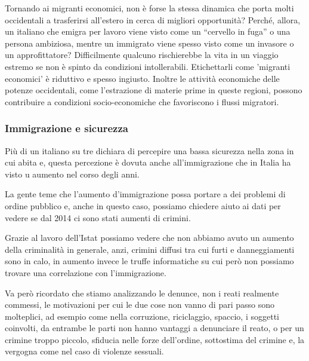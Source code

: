 \documentclass[12pt]{book} %
\begin{document}
Tornando ai migranti economici, non è forse la stessa dinamica che porta molti occidentali a trasferirsi all’estero in cerca di migliori opportunità? Perché, allora, un italiano che emigra per lavoro viene visto come un “cervello in fuga” o una persona ambiziosa, mentre un immigrato viene spesso visto come un invasore o un approfittatore? Difficilmente qualcuno rischierebbe la vita in un viaggio estremo se non è spinto da condizioni intollerabili. Etichettarli come 'migranti economici' è riduttivo e spesso ingiusto.
Inoltre le attività economiche delle potenze occidentali, come l’estrazione di materie prime in queste regioni, possono contribuire a condizioni socio-economiche che favoriscono i flussi migratori.

\subsubsection{Immigrazione e sicurezza}
Più di un italiano su tre dichiara di percepire una bassa sicurezza nella zona in cui abita e, questa percezione è dovuta anche
all'immigrazione che in Italia ha visto u aumento nel corso degli anni.

La gente teme che l'aumento d'immigrazione possa portare a dei problemi di
ordine pubblico e, anche in questo caso, possiamo chiedere aiuto ai dati per vedere se dal 2014 ci sono stati aumenti
di crimini.

Grazie al lavoro dell'Istat possiamo vedere
che non abbiamo avuto un aumento della criminalità in generale, anzi, crimini diffusi tra cui furti e danneggiamenti
sono in calo, in aumento invece le truffe informatiche su cui però non possiamo trovare una correlazione con
l'immigrazione.

Va però ricordato che stiamo analizzando le denunce, non i reati realmente commessi, le motivazioni per cui le due cose
non vanno di pari passo sono molteplici, ad esempio come nella corruzione, riciclaggio, spaccio, i soggetti coinvolti,
da entrambe le parti non hanno vantaggi a denunciare il reato, o per un crimine troppo piccolo, sfiducia nelle forze
dell'ordine, sottostima del crimine e, la vergogna come nel caso di violenze sessuali.
\end{document}
